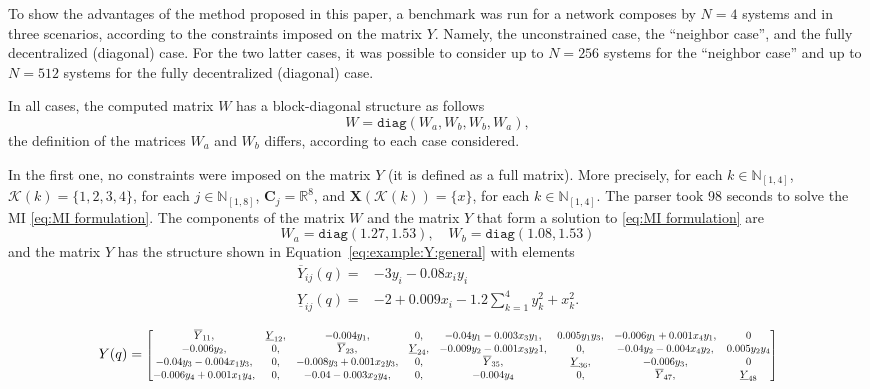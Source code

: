 \documentclass[10pt,twocolumn,twoside]{IEEEtran}
\theoremstyle{plain}
\theoremstyle{definition}
\theoremstyle{remark}
\begin{document}
To show the advantages of the method proposed in this paper, a benchmark was run for a network composes by $N=4$ systems and in three scenarios, according to the constraints imposed on the matrix $Y$. Namely, the unconstrained case, the ``neighbor case'', and the fully decentralized (diagonal) case. For the two latter cases, it was possible to consider up to $N=256$ systems for the ``neighbor case'' and up to $N=512$ systems for the fully decentralized (diagonal) case.

In all cases, the computed matrix $W$ has a block-diagonal structure as follows
\begin{equation*}
 W=\mathbin{\mathtt{diag}}\left(W_a,W_b,W_b,W_a\right),
\end{equation*}
the definition of the matrices $W_a$ and $W_b$ differs, according to each case considered.

In the first one, no constraints were imposed on the matrix $Y$ (it is defined as a full matrix). More precisely, for each $k\in\mathbb{N}_{[1,4]}$, $\mathscr{K}(k)=\{1,2,3,4\}$, for each $j\in\mathbb{N}_{[1,8]}$, $\mathbf{C}_j=\mathbb{R}^8$, and $\mathbf{X}(\mathscr{K}(k))=\{x\}$, for each $k\in\mathbb{N}_{[1,4]}$. The parser took 98  seconds to solve the MI \eqref{eq:MI formulation}. The components of the matrix $W$ and the matrix $Y$ that form a solution to \eqref{eq:MI formulation} are
\begin{equation*}
		W_a=\mathbin{\mathtt{diag}}\left(
 1.27,1.53\right),\quad W_b=\mathbin{\mathtt{diag}}\left(1.08,1.53\right)
\end{equation*}
and the matrix $Y$ has the structure shown in Equation~\eqref{eq:example:Y:general} with elements
\begin{align*}
 \overline{Y}_{ij}(q)=&-3y_i-0.08x_iy_i\\
 \underline{Y}_{ij}(q)=&-2+0.009x_i-1.2\sum_{k=1}^4 y_k^2+x_k^2.
\end{align*}

\begin{figure}
\begin{equation}\label{eq:example:Y:general}
		Y(q)=\scalebox{0.75}{$\begin{bmatrix}
			\overline{Y}_{11},&\underline{Y}_{12},&-0.004y_1,&0,&-0.04y_1-0.003x_3y_1,&0.005y_1y_3,&-0.006y_1+0.001x_4y_1,&0\\
			-0.006y_2,&0,&\overline{Y}_{23},&\underline{Y}_{24},&-0.009y_2-0.001x_3y_21,&0,&-0.04y_2-0.004x_4y_2,&0.005y_2y_4\\
			-0.04y_3-0.004x_1y_3,&0,&-0.008y_3+0.001x_2y_3,&0,&\overline{Y}_{35},&\underline{Y}_{36},&-0.006y_3,&0\\
			-0.006y_4+0.001x_1y_4,&0,&-0.04-0.003x_2y_4,&0,&-0.004y_4&0,&\overline{Y}_{47},&\underline{Y}_{48}
		\end{bmatrix}$}
\end{equation}
\end{figure}
\end{document}
